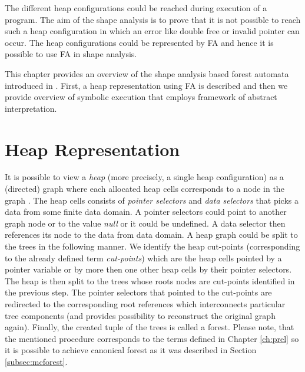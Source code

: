 The different heap configurations could be reached during execution of a program.
The aim of the shape analysis is to prove that it is not possible to reach such a heap configuration in which
an error like double free or invalid pointer can occur.
The heap configurations could be represented by FA and hence it is possible
to use FA in shape analysis.

This chapter provides an overview of the shape analysis based forest automata introduced in \cite{forester12}.
First, a heap representation using FA is described and then
we provide overview of symbolic execution that employs framework of abstract interpretation.

\section{Heap Representation}
\label{sec:hd}

It is possible to view a \emph{heap} (more precisely, a single heap configuration)
as a (directed) graph where each allocated heap cells corresponds to a node in the graph \cite{forester13}.
The heap cells consists of \emph{pointer selectors} and \emph{data selectors} that picks a data from some finite data domain.
A pointer selectors could point to another graph node or to the value \emph{null} or it could be undefined.
A data selector then references its node to the data from data domain.
A heap graph could be split to the trees in the following manner.
We identify the heap cut-points (corresponding to the already defined term \emph{cut-points})
which are the heap cells pointed by a pointer variable or by more then one other heap cells by their pointer selectors.
The heap is then split to the trees whose roots nodes are cut-points identified in the previous step.
The pointer selectors that pointed to the cut-points are redirected to the corresponding root references which interconnects
particular tree components (and provides possibility to reconstruct the original graph again).
Finally, the created tuple of the trees is called a forest.
Please note, that the mentioned procedure corresponds to the terms defined in Chapter \ref{ch:prel}
so it is possible to achieve canonical forest as it was described in Section \ref{subsec:mcforest}.

